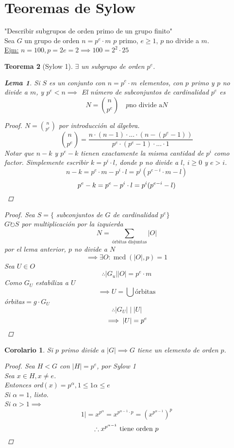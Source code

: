 \documentclass[11pt]{book}
\DeclareMathOperator{\mcd}{mcd}
\newtheorem{thm}{Teorema}[section]
\newtheorem{lem}[thm]{Lema}
\newtheorem*{cor}{Corolario}
\theoremstyle{definition}
\begin{document}
\section{Teoremas de Sylow}
"Describir subgrupos de orden primo de un grupo finito"\\
Sea $G$ un grupo de orden $n=p^e\cdot m$ $p$ primo, $e\geq 1$, $p$ no divide a $m$.\\
\underline{Ejm:} $n=100, p=2 e=2\implies 100=2^2\cdot 25$
\begin{thm}[Sylow 1]
	$\exists$ un subgrupo de orden $p^e$.
	\begin{lem}
		Si $S$ es un conjunto con $n=p^e\cdot m$ elementos, con $p$ primo y $p$ no divide a $m$, y $p^e<n\implies$ El número de subconjuntos de cardinalidad $p^e$ es
		\[N=\binom{n}{p^e}\quad p\textrm{no divide a} N\]
		\begin{proof}
			$N=\binom{n}{p^e}$ por introducción al álgebra.
			\[\binom{n}{p^e}=\frac{n\cdot(n-1)\cdot...\cdot (n-(p^e-1))}{p^e\cdot (p^e-1)\cdot...\cdot 1}\]
			Notar que $n-k$ y $p^e-k$ tienen exactamente la misma cantidad de $p^i$ como factor. Simplemente escribir $k=p^i\cdot l$, donde $p$ no divide a $l$, $i\geq 0$ y $e>i$.
			\[n-k=p^e\cdot m-p^i\cdot l=p^i(p^{e-i}\cdot m-l)\]
			\[p^e-k=p^e-p^i\cdot l=p^i(p^{e-i}-l)\qedhere\]
		\end{proof}
	\end{lem}
	\begin{proof}
		Sea $S=\{$ subconjuntos de $G$ de cardinalidad $p^e\}$\\
		$G\circlearrowright S$ por multiplicación por la izquierda
		\[N=\sum_{\textrm{órbitas disjuntas}}|O|\]
		por el lema anterior, $p$ no divide a $N$
		\[\implies \exists O:\mcd(|O|,p)=1\]
		Sea $U\in O$
		\[\therefore |G_u||O|=p^e\cdot m\]
		Como $G_U$ estabiliza a $U$
		\[\implies U=\bigcup\textrm{órbitas}\]
		órbitas$=g\cdot G_U$
		\[\therefore |G_U|\mid|U|\]
		\[\implies|U|=p^e\qedhere\]
	\end{proof}
\end{thm}
\begin{cor}
	Si $p$ primo divide a $|G|\implies G$ tiene un elemento de orden $p$.
	\begin{proof}
		Sea $H<G$ con $|H|=p^e$, por Sylow 1\\
		Sea $x\in H,x\neq e$.\\
		Entonces ord$(x)=p^\alpha,1\leq 1 \alpha\leq e$\\
		Si $\alpha=1$, listo.\\
		Si $\alpha>1\implies$
		\[1|=x^{p^{\alpha}}=x^{p^{\alpha-1}\cdot p}=(x^{p^{\alpha-1}})^p\]
		\[\therefore x^{p^{\alpha-1}}\textrm{ tiene orden }p\qedhere\]
	\end{proof}  
\end{cor}
\end{document}
